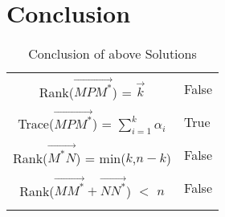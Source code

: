 \documentclass[journal,12pt]{IEEEtran}
\begin{document}
\section{\textbf{Conclusion}}
\renewcommand{\thetable}{3}
\begin{longtable}{|c|l|}
    \hline
	\multirow{3}{*}{Rank($\vec{MP{M}^*}$) = $\vec{k}$} 
	& \\
	& False \\
	&\\
	\hline
	\multirow{3}{*}{{Trace($\vec{MP{M}^*}$) = $\sum_{i=1}^{k}\alpha_i$}} 
	& \\
	& True \\
	& \\
	\hline
	\multirow{3}{*}{Rank($\vec{{M}^*N}$) = min($k$,$n-k$)} 
	& \\
	& False \\
	& \\
	\hline
	\multirow{3}{*}{Rank($\vec{M{M}^*}+\vec{N{N}^*}$) $<$ $n$} 
	& \\
	& False \\
	& \\
	\hline
	\caption{Conclusion of above Solutions}
    \label{table:3}
\end{longtable}
\end{document}
